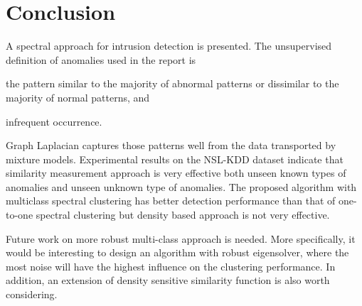 \section{Conclusion}
A spectral approach for intrusion detection is presented. 
The unsupervised definition of anomalies used in the report is 
\begin{inparaenum}
\item the pattern similar to the majority of abnormal patterns or dissimilar to the majority of normal patterns, and
\item infrequent occurrence.
\end{inparaenum}
Graph Laplacian captures those patterns well from the data transported by mixture models. 
Experimental results on the NSL-KDD dataset indicate that similarity measurement approach is very effective both unseen known types of anomalies and unseen unknown type of anomalies. 
The proposed algorithm with multiclass spectral clustering has better detection performance than that of one-to-one spectral clustering but density based approach is not very effective. 

Future work on more robust multi-class approach is needed. 
More specifically, it would be interesting to design an algorithm with robust eigensolver, where the most noise will have the highest influence on the clustering performance. 
In addition, an extension of density sensitive similarity function is also worth considering. 
